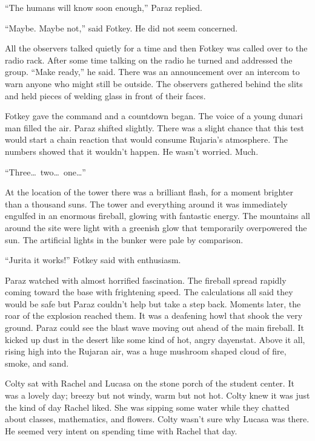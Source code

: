 ``The humans will know soon enough,'' Paraz replied.

``Maybe. Maybe not,'' said Fotkey. He did not seem concerned.

All the observers talked quietly for a time and then Fotkey was called over to the radio rack.
After some time talking on the radio he turned and addressed the group. ``Make ready,'' he said.
There was an announcement over an intercom to warn anyone who might still be outside. The
observers gathered behind the slits and held pieces of welding glass in front of their faces.

Fotkey gave the command and a countdown began. The voice of a young dunari man filled the air.
Paraz shifted slightly. There was a slight chance that this test would start a chain reaction
that would consume Rujaria's atmosphere. The numbers showed that it wouldn't happen. He wasn't
worried. Much.

``Three\ldots\ two\ldots\ one\ldots''

At the location of the tower there was a brilliant flash, for a moment brighter than a thousand
suns. The tower and everything around it was immediately engulfed in an enormous fireball,
glowing with fantastic energy. The mountains all around the site were light with a greenish glow
that temporarily overpowered the sun. The artificial lights in the bunker were pale by
comparison.

``Jurita it works!'' Fotkey said with enthusiasm.

Paraz watched with almost horrified fascination. The fireball spread rapidly coming toward the
base with frightening speed. The calculations all said they would be safe but Paraz couldn't
help but take a step back. Moments later, the roar of the explosion reached them. It was a
deafening howl that shook the very ground. Paraz could see the blast wave moving out ahead of
the main fireball. It kicked up dust in the desert like some kind of hot, angry dayenstat. Above
it all, rising high into the Rujaran air, was a huge mushroom shaped cloud of fire, smoke, and
sand.

\breakpoint

Colty sat with Rachel and Lucasa on the stone porch of the student center. It was a lovely day;
breezy but not windy, warm but not hot. Colty knew it was just the kind of day Rachel liked. She
was sipping some water while they chatted about classes, mathematics, and flowers. Colty wasn't
sure why Lucasa was there. He seemed very intent on spending time with Rachel that day.

